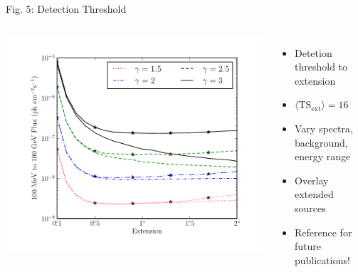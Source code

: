 \documentclass[12pt]{beamer}
\begin{document}
\begin{frame}{Fig. 5: Detection Threshold}
  \begin{columns}
    \includegraphics[scale=0.5]{plots/index_sensitivity_color.pdf}
    \begin{itemize}
      \item Detetion threshold to extension
      \item $\langle\text{TS}_\text{ext}\rangle=16$
      \item Vary spectra, background, energy range
      \item Overlay extended sources
      \item Reference for future publications!
    \end{itemize}
  \end{columns}
\end{frame}
\end{document}
